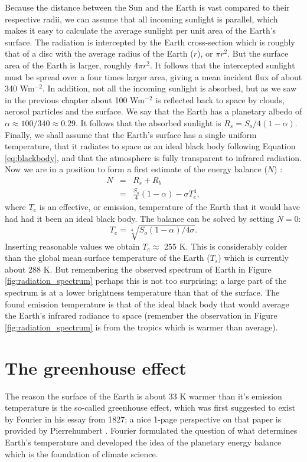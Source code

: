 \documentclass[12pt]{book}
\begin{document}
Because the distance between the Sun and the Earth is vast compared to their respective radii, we can assume that all incoming sunlight is parallel, which makes it easy to calculate the average sunlight per unit area of the Earth's surface. The radiation is intercepted by the Earth cross-section which is roughly that of a disc with the average radius of the Earth ($r$), or $\pi r^2$. But the surface area of the Earth is larger, roughly $4\pi r^2$. It follows that the intercepted sunlight must be spread over a four times larger area, giving a mean incident flux of about 340 Wm$^{-2}$. In addition, not all the incoming sunlight is absorbed, but as we saw in the previous chapter about 100 Wm$^{-2}$ is reflected back to space by clouds, aerosol particles and the surface. We say that the Earth has a planetary albedo of $\alpha \approx 100/340 \approx 0.29$. It follows that the absorbed sunlight is $R_s=S_o/4(1-\alpha)$. Finally, we shall assume that the Earth's surface has a single uniform temperature, that it radiates to space as an ideal black body following Equation \ref{eq:blackbody}, and that the atmosphere is fully transparent to infrared radiation.
Now we are in a position to form a first estimate of the energy balance ($N$) :
\begin{eqnarray}
N &=& R_s + R_b \nonumber \\ 
   &=& \frac{S_o}{4}(1-\alpha) - \sigma T_e^4,
\label{eq:black_body_energy_balance}
\end{eqnarray}
\noindent where $T_e$ is an effective, or emission, temperature of the Earth that it would have had had it been an ideal black body. The balance  can be solved by setting $N=0$:
\begin{equation}
T_e = \sqrt[4]{S_o(1-\alpha)/4\sigma}. 
\end{equation}
Inserting reasonable values we obtain $T_e \approx$  255 K. This is considerably colder than the global mean surface temperature of the Earth ($T_s$) which is currently about 288 K. But remembering the observed spectrum of Earth in Figure \ref{fig:radiation_spectrum} perhaps this is not too surprising; a large part of the spectrum is at a lower brightness temperature than that of the surface. The found emission temperature is that of the ideal black body that would average the Earth's infrared radiance to space (remember the observation in Figure \ref{fig:radiation_spectrum} is from the tropics which is warmer than average).

\section{The greenhouse effect}
The reason the surface of the Earth is about 33 K warmer than it's emission temperature is the so-called greenhouse effect, which was first suggested to exist by Fourier in his essay from 1827; a nice 1-page perspective on that paper is provided by Pierrehumbert \cite{Pierrehumbert2004}. Fourier formulated the question of what determines Earth's temperature and developed the idea of the planetary energy balance which is the foundation of climate science. 
\end{document}
